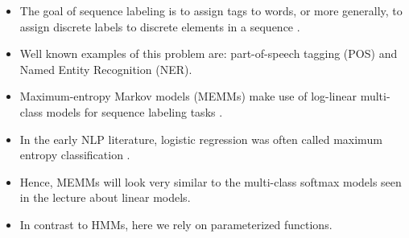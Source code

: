 \begin{itemize}

\item The goal of sequence labeling is to assign tags to words, or more generally, to assign discrete labels to discrete elements in a sequence \cite{jacobbook}.

\item Well known examples of this problem are: part-of-speech tagging (POS) and Named Entity Recognition (NER).

\item Maximum-entropy Markov models (MEMMs) make use of log-linear multi-class models for sequence labeling tasks \cite{mccallum2000maximum}.
 
 \item In the early NLP literature, logistic regression was often called maximum entropy classification \cite{jacobbook}.
 
 \item Hence, MEMMs will look very similar to the multi-class softmax models seen in the lecture about linear models. 
 
  \item In contrast to HMMs, here we rely on parameterized functions.

\end{itemize}


